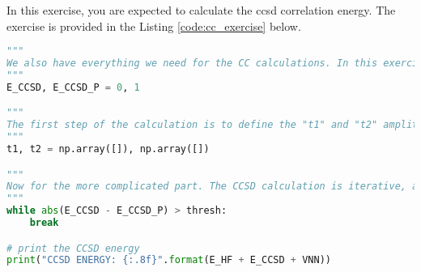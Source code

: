 In this exercise, you are expected to calculate the \acrshort{ccsd} correlation energy. The exercise is provided in the Listing \ref{code:cc_exercise} below.

\raggedbottom\begin{lstlisting}[language=Python, caption={\acrshort{ccsd} exercise code.}, label=code:cc_exercise]
"""
We also have everything we need for the CC calculations. In this exercise, we will calculate the CCSD energy. Since the calculation will be iterative, I define here the CCSD energy as zero, the "E_CCSD_P" variable will be used to monitor convergence.
"""
E_CCSD, E_CCSD_P = 0, 1

"""
The first step of the calculation is to define the "t1" and "t2" amplitudes. These arrays can be initialized as zero arrays with the appropriate dimensions. I will leave this task to you.
"""
t1, t2 = np.array([]), np.array([])

"""
Now for the more complicated part. The CCSD calculation is iterative, and the convergence criterion is set by the "thresh" variable. The while loop should be filled with the appropriate calculations. The calculation of the "t1" and "t2" amplitudes is the most challenging part of the CCSD calculation. After convergence, the "E_CCSD" variable should store the final CCSD energy.
"""
while abs(E_CCSD - E_CCSD_P) > thresh:
    break

# print the CCSD energy
print("CCSD ENERGY: {:.8f}".format(E_HF + E_CCSD + VNN))
\end{lstlisting}
